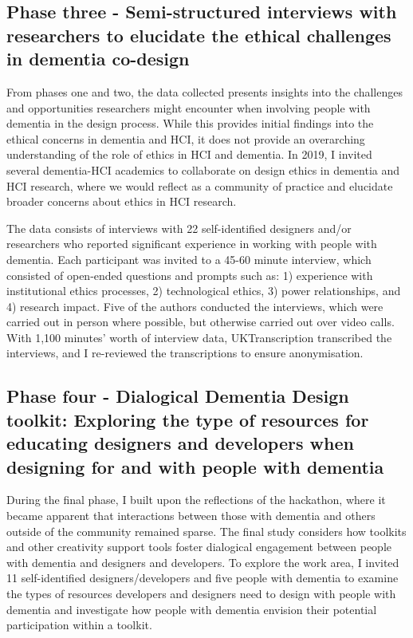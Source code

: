 \subsection{Phase three - Semi-structured interviews with researchers to elucidate the ethical challenges in dementia co-design}

From phases one and two, the data collected presents insights into the challenges and opportunities researchers might encounter when involving people with dementia in the design process. While this provides initial findings into the ethical concerns in dementia and HCI, it does not provide an overarching understanding of the role of ethics in HCI and dementia. In 2019, I invited several dementia-HCI academics to collaborate on design ethics in dementia and HCI research, where we would reflect as a community of practice and elucidate broader concerns about ethics in HCI research.

The data consists of interviews with 22 self-identified designers and/or researchers who reported significant experience in working with people with dementia. Each participant was invited to a 45-60 minute interview, which consisted of open-ended questions and prompts such as: 1) experience with institutional ethics processes, 2) technological ethics,
3) power relationships, and 4) research impact. Five of the authors conducted the interviews, which were carried out in person where possible, but otherwise carried out over video calls. With 1,100 minutes' worth of interview data, UKTranscription transcribed the interviews, and I re-reviewed the transcriptions to ensure anonymisation.


\subsection{Phase four - Dialogical Dementia Design toolkit: Exploring the type of resources for educating designers and developers when designing for and with people with dementia}

During the final phase, I built upon the reflections of the hackathon, where it became apparent that interactions between those with dementia and others outside of the community remained sparse. The final study considers how toolkits and other creativity support tools foster dialogical engagement between people with dementia and designers and developers. To explore the work area, I invited 11 self-identified designers/developers and five people with dementia to examine the types of resources developers and designers need to design with people with dementia and investigate how people with dementia envision their potential participation within a toolkit.

